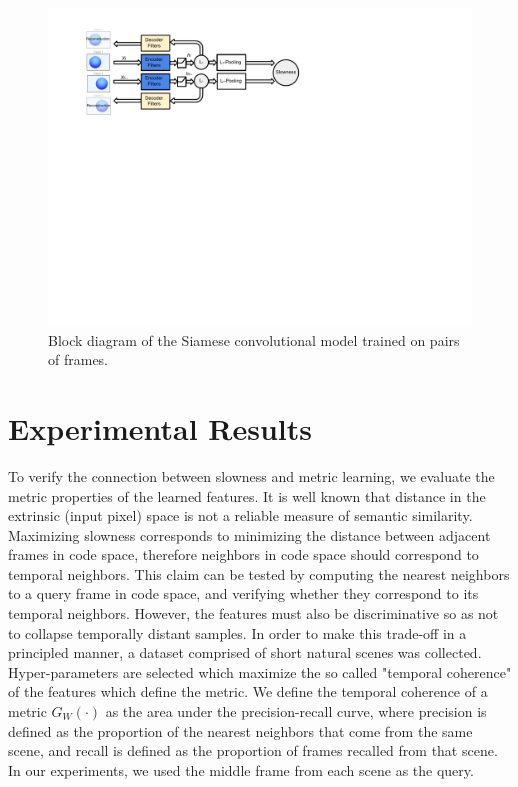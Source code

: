 \documentclass{article} %
\begin{document}
\begin{figure}
\centering
\includegraphics[scale=0.75,trim = 15 350 290 39, clip]{./Rebbutal_Figures/diagram.pdf}
\caption{Block diagram of the Siamese convolutional model trained on pairs of frames. \label{fig:diagram}}  
\end{figure}
\section{Experimental Results}
To verify the connection between slowness and metric learning, we evaluate the metric properties of the learned features. It is well known that distance in the extrinsic (input pixel) space is not a reliable measure of semantic similarity. Maximizing slowness corresponds to minimizing the distance between adjacent frames in code space, therefore neighbors in code space should correspond to temporal neighbors. This claim can be tested by computing the nearest neighbors to a query frame in code space, and verifying whether they correspond to its temporal neighbors. However, the features must also be discriminative so as not to collapse temporally distant samples. In order to make this trade-off in a principled manner, a dataset comprised of short natural scenes was collected. Hyper-parameters are selected which maximize the so called "temporal coherence" of the features which define the metric. We define the temporal coherence of a metric $G_W(\cdot)$ as the area under the precision-recall curve, where precision is defined as the proportion of the nearest neighbors that come from the same scene, and recall is defined as the proportion of frames recalled from that scene. In our experiments, we used the middle frame from each scene as the query. 
\end{document}
